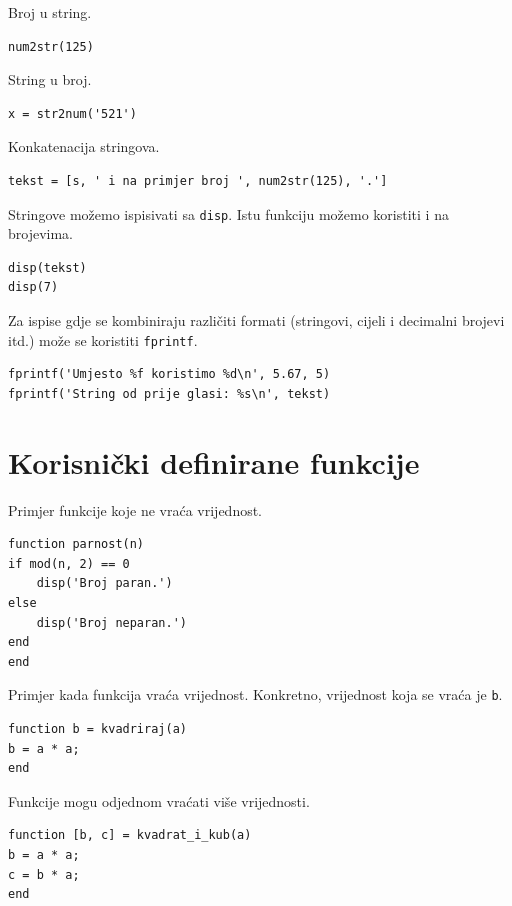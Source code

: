 \documentclass[a4paper, 10pt]{article}
\begin{document}
Broj u string.

\begin{lstlisting}
num2str(125)
\end{lstlisting}

String u broj.

\begin{lstlisting}
x = str2num('521')
\end{lstlisting}

Konkatenacija stringova.

\begin{lstlisting}
tekst = [s, ' i na primjer broj ', num2str(125), '.']
\end{lstlisting}

Stringove možemo ispisivati sa \texttt{disp}. Istu funkciju možemo koristiti i na brojevima.

\begin{lstlisting}
disp(tekst)
disp(7)
\end{lstlisting}

Za ispise gdje se kombiniraju različiti formati (stringovi, cijeli i decimalni brojevi itd.) može se koristiti \texttt{fprintf}.

\begin{lstlisting}
fprintf('Umjesto %f koristimo %d\n', 5.67, 5)
fprintf('String od prije glasi: %s\n', tekst)
\end{lstlisting}

\section{Korisnički definirane funkcije}

Primjer funkcije koje ne vraća vrijednost.

\begin{lstlisting}
function parnost(n)
if mod(n, 2) == 0
    disp('Broj paran.')
else
    disp('Broj neparan.')
end
end
\end{lstlisting}

Primjer kada funkcija vraća vrijednost. Konkretno, vrijednost koja se vraća je \texttt{b}.

\begin{lstlisting}
function b = kvadriraj(a)
b = a * a;
end
\end{lstlisting}

Funkcije mogu odjednom vraćati više vrijednosti.

\begin{lstlisting}
function [b, c] = kvadrat_i_kub(a)
b = a * a;
c = b * a;
end
\end{lstlisting}
\end{document}
